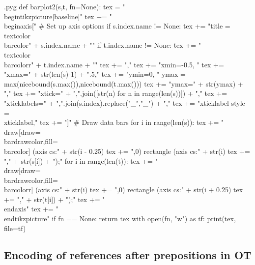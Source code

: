 \documentclass{report}
\makeatletter
\newenvironment{python}{%
  \VerbatimEnvironment
  \minted@resetoptions
  \setkeys{minted@opt}{}
      \begin{VerbatimOut}{\jobname.pyg}}
{%
      \end{VerbatimOut}
      \minted@pygmentize{python}
      \DeleteFile{\jobname.pyg}}
\makeatother
\begin{document}
\begin{python}
def barplot2(s,t, fn=None):
    tex = "\\begin{tikzpicture}[baseline]\n"
    tex += "\\begin{axis}[\n"
    # Set up axis options
    if s.index.name != None:
        tex += "title = \\textcolor{\\barcolor}{" + s.index.name + "}"
    if t.index.name != None:
        tex += "\n \\textcolor{\\barcolorr}{" + t.index.name + "}"
    tex += ",\n"
    tex += "xmin=-0.5, "
    tex += "xmax=" + str(len(s)-1) + ".5,\n"
    tex += "ymin=0, "
    ymax = max(nicebound(s.max()),nicebound(t.max()))
    tex += "ymax=" + str(ymax) + ",\n"
    tex += "xtick={" + ",".join([str(n) for n in range(len(s))]) + "},\n"
    tex += "xticklabels={" + ",".join(s.index).replace("_","\_") + "},\n"
    tex += "xticklabel style = {\\xticklabel},\n"
    tex += "]\n"
    # Draw data bars
    for i in range(len(s)):
        tex += "\\draw[draw=\\bardrawcolor,fill=\\barcolor] (axis cs:" + str(i - 0.25)
        tex += ",0) rectangle (axis cs:" + str(i)
        tex += "," + str(s[i]) + ");\n"
    for i in range(len(t)):
        tex += "\\draw[draw=\\bardrawcolor,fill=\\barcolorr] (axis cs:" + str(i)
        tex += ",0) rectangle (axis cs:" + str(i + 0.25)
        tex += "," + str(t[i]) + ");\n"
    tex += "\\end{axis}\n"
    tex += "\\end{tikzpicture}\n"
    if fn == None:
        return tex
    with open(fn, "w") as tf:
        print(tex, file=tf)

\end{python}


\subsection{Encoding of references after prepositions in OT}
\end{document}
